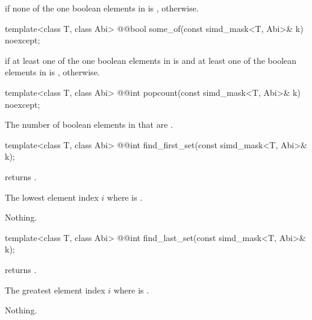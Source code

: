 \begin{itemdescr}
  \pnum\returns
   if none of the one boolean elements in  is ,  otherwise.
\end{itemdescr}

\begin{itemdecl}
template<class T, class Abi> @@bool some_of(const simd_mask<T, Abi>& k) noexcept;
\end{itemdecl}

\begin{itemdescr}
  \pnum\returns
   if at least one of the one boolean elements in  is  and at least one of the boolean elements in  is ,  otherwise.
\end{itemdescr}

\begin{itemdecl}
template<class T, class Abi> @@int popcount(const simd_mask<T, Abi>& k) noexcept;
\end{itemdecl}

\begin{itemdescr}
  \pnum\returns
  The number of boolean elements in  that are .
\end{itemdescr}

\begin{itemdecl}
template<class T, class Abi> @@int find_first_set(const simd_mask<T, Abi>& k);
\end{itemdecl}

\begin{itemdescr}
  \pnum\requires
   returns .

  \pnum\returns
  The lowest element index $i$ where  is .

  \pnum\throws Nothing.
\end{itemdescr}

\begin{itemdecl}
template<class T, class Abi> @@int find_last_set(const simd_mask<T, Abi>& k);
\end{itemdecl}

\begin{itemdescr}
  \pnum\requires
   returns .

  \pnum\returns
  The greatest element index $i$ where  is .

  \pnum\throws Nothing.
\end{itemdescr}

